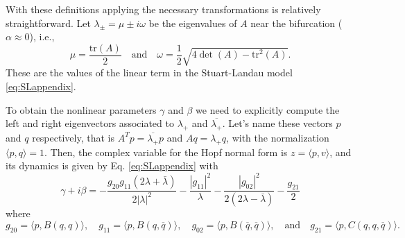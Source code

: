 With these definitions applying the necessary transformations is relatively straightforward. 
Let
$\lambda_\pm = \mu\pm i\omega$ be the eigenvalues of $A$ near the bifurcation ($\alpha\approx 0$), i.e.,
\begin{equation}
\mu =\frac{\mathrm{tr}(A)}{2}\quad\text{and}\quad\omega =\frac{1}{2} \sqrt{4\det(A) - \mathrm{tr}^2(A)}.
\end{equation}
These are the values of the linear term in the Stuart-Landau model \eqref{eq:SLappendix}.

To obtain the nonlinear parameters $\gamma$ and $\beta$ we need to explicitly compute the left and right eigenvectors associated to $\lambda_+$ and $\overline{\lambda_+}$. Let's name these vectors $p$ and $q$ respectively,
that is $A^T p = \overline{\lambda_+}p$ and $Aq = \lambda_+ q$, with the normalization $\langle p,q \rangle = 1$.
Then, the complex variable for the Hopf normal form is $z = \langle p,v \rangle$,
and its dynamics is given by Eq. \eqref{eq:SLappendix} with 
\begin{equation}
    \gamma + i\beta  = -\frac{g_{20}g_{11}(2\lambda + \bar{\lambda})}{2|\lambda|^2} - \frac{|g_{11}|^2}{\lambda} - \frac{|g_{02}|^2}{2(2\lambda - \bar{\lambda})} - \frac{g_{21}}{2}
\end{equation}
where
\begin{equation}
    g_{20} = \langle p,B(q , q) \rangle, \quad
    g_{11} = \langle p, B(q , \overline{q})\rangle, \quad
    g_{02} = \langle p, B(\overline{q} , \overline{q})\rangle,\quad \text{and}\quad
    g_{21} = \langle p, C(q,q,\overline{q})\rangle.
\end{equation}

